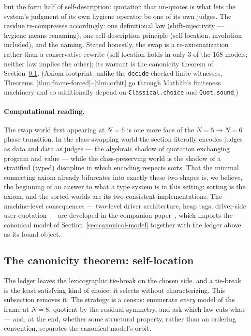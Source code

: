 \documentclass[sigconf,screen]{acmart}
\theoremstyle{remark}
\begin{document}
but the form half of self-description: quotation that un-quotes is
what lets the system's judgment of its own hygiene operator be one
of its own judges. The residue re-compresses accordingly: one
definitional law (shift-injectivity --- hygiene means renaming), one
self-description principle (self-location, involution included), and
the naming. Stated honestly, the swap is a re-axiomatization rather
than a conservative rewrite (self-location holds in only $3$ of the
$168$ models; neither law implies the other); its warrant is the
canonicity theorem of Section~\ref{sec:canonicity}. (Axiom footprint: unlike the \texttt{decide}-checked
finite witnesses, Theorems~\ref{thm:frame-forced}--\ref{thm:orbit} go
through Mathlib's finiteness machinery and so additionally depend on
\texttt{Classical.choice} and \texttt{Quot.sound}.)

\paragraph{Computational reading.}
The swap world first appearing at $N\!=\!6$ is one more face of the
$N\!=\!5 \to N\!=\!6$ phase transition. In the class-swapping world the
section literally encodes judges as data and data as judges --- the
algebraic shadow of quotation exchanging program and value --- while
the class-preserving world is the shadow of a stratified (typed)
discipline in which encoding respects sorts. That the minimal
connecting axiom already bifurcates into exactly these two shapes is,
we believe, the beginning of an answer to what a type system is in
this setting: sorting is the axiom, and the sorted worlds are its two
consistent implementations. The machine-level consequences ---
two-level driver architecture, heap tags, driver-side user quotation
--- are developed in the companion paper~\cite{companion-pearl}, which
imports the canonical model of Section~\ref{sec:canonical-model}
together with the ledger above as its found object.

\subsection{The canonicity theorem: self-location}
\label{sec:canonicity}

The ledger leaves the lexicographic tie-break on the chosen side, and
a tie-break is the least satisfying kind of choice: it selects without
characterizing. This subsection removes it. The strategy is a census:
enumerate \emph{every} model of the frame at $N\!=\!8$, quotient by
the residual symmetry, and ask which law cuts what --- and, at the
end, whether some structural property, rather than an ordering
convention, separates the canonical model's orbit.
\end{document}
